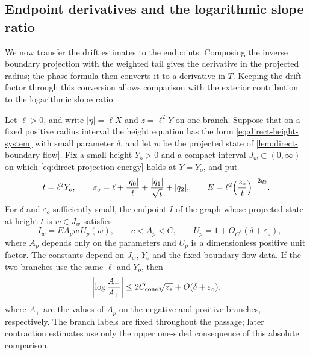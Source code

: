 \subsection{Endpoint derivatives and the logarithmic slope ratio}

We now transfer the drift estimates to the endpoints. Composing the
inverse boundary projection with the weighted tail gives the derivative
in the projected radius; the phase formula then converts it to a
derivative in \(T\). Keeping the drift factor through this conversion
allows comparison with the exterior contribution to the logarithmic
slope ratio.

\pagebreak[3]
\begin{lemma}
\label{lem:boundary-flow-endpoint}
Let \(\ell>0\), and write \(|\eta|=\ell X\) and \(z=\ell^2Y\) on one
branch. Suppose that on a fixed positive radius interval the height
equation has the form \eqref{eq:direct-height-system} with small
parameter \(\delta\), and let \(w\) be the projected state of
\cref{lem:direct-boundary-flow}. Fix a small height \(Y_o>0\) and a
compact interval \(J_w\subset(0,\infty)\) on which
\eqref{eq:direct-projection-energy} holds at \(Y=Y_o\), and put
\[
 t=\ell^2Y_o,\qquad
 \varepsilon_o=\ell+\frac{|q_0|}t+\frac{|q_1|}{\sqrt t}+|q_2|,\qquad
 E=\ell^2\Bigl(\frac{z_*}{t}\Bigr)^{-2q_2}.
\]
For \(\delta\) and \(\varepsilon_o\) sufficiently small, the endpoint
\(I\) of the graph whose projected state at height \(t\) is
\(w\in J_w\) satisfies
\begin{equation}
\label{eq:boundary-flow-endpoint}
 -I_w=EA_p w\,U_p(w),\qquad c<A_p<C,\qquad
 U_p=1+O_{C^3}(\delta+\varepsilon_o),
\end{equation}
where \(A_p\) depends only on the parameters and \(U_p\) is a
dimensionless positive unit factor. The constants depend on
\(J_w\), \(Y_o\) and the fixed boundary-flow data. If the two branches
use the same \(\ell\) and \(Y_o\), then
\begin{equation}
\label{eq:boundary-flow-amplitude-ratio}
 \left|\log\frac{A_-}{A_+}\right|
 \le2C_{\rm cone}\sqrt{z_*}+O(\delta+\varepsilon_o),
\end{equation}
where \(A_\pm\) are the values of \(A_p\) on the negative and positive
branches, respectively.  The branch labels are fixed throughout the
passage; later contraction estimates use only the upper one-sided
consequence of this absolute comparison.
\end{lemma}

